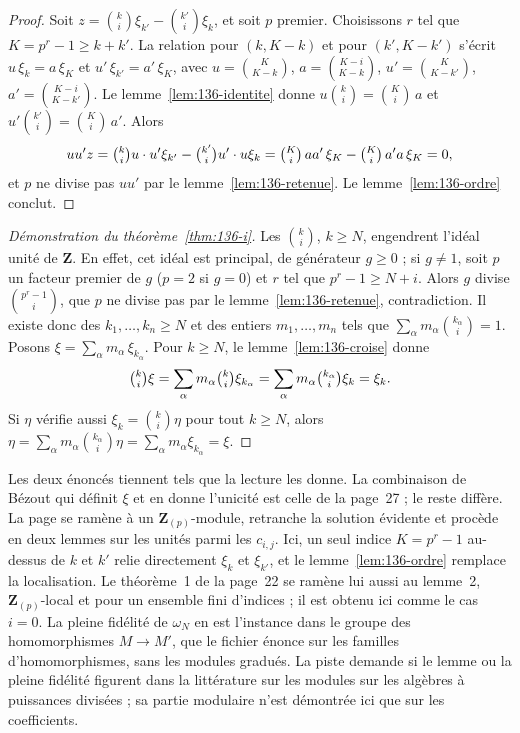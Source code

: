 \begin{proof}
Soit $z = \binom{k}{i} \xi_{k'} - \binom{k'}{i} \xi_k$, et soit $p$ premier. Choisissons $r$ tel que $K = p^r - 1 \geq k + k'$. La relation pour $(k, K - k)$ et pour $(k', K - k')$ s'écrit $u\, \xi_k = a\, \xi_K$ et $u'\, \xi_{k'} = a'\, \xi_K$, avec $u = \binom{K}{K-k}$, $a = \binom{K - i}{K - k}$, $u' = \binom{K}{K-k'}$, $a' = \binom{K-i}{K-k'}$. Le lemme~\ref{lem:136-identite} donne $u \binom{k}{i} = \binom{K}{i}\, a$ et $u' \binom{k'}{i} = \binom{K}{i}\, a'$. Alors
\[ u u' z = \tbinom{k}{i} u \cdot u' \xi_{k'} - \tbinom{k'}{i} u' \cdot u \xi_k = \tbinom{K}{i}\, a a'\, \xi_K - \tbinom{K}{i}\, a' a\, \xi_K = 0, \]
et $p$ ne divise pas $u u'$ par le lemme~\ref{lem:136-retenue}. Le lemme~\ref{lem:136-ordre} conclut.
\end{proof}

\begin{proof}[Démonstration du théorème~\ref{thm:136-i}]
Les $\binom{k}{i}$, $k \geq N$, engendrent l'idéal unité de $\mathbf Z$. En effet, cet idéal est principal, de générateur $g \geq 0$ ; si $g \neq 1$, soit $p$ un facteur premier de $g$ ($p = 2$ si $g = 0$) et $r$ tel que $p^r - 1 \geq N + i$. Alors $g$ divise $\binom{p^r - 1}{i}$, que $p$ ne divise pas par le lemme~\ref{lem:136-retenue}, contradiction. Il existe donc des $k_1, \ldots, k_n \geq N$ et des entiers $m_1, \ldots, m_n$ tels que $\sum_\alpha m_\alpha \binom{k_\alpha}{i} = 1$. Posons $\xi = \sum_\alpha m_\alpha\, \xi_{k_\alpha}$. Pour $k \geq N$, le lemme~\ref{lem:136-croise} donne
\[ \tbinom{k}{i} \xi = \sum_\alpha m_\alpha \tbinom{k}{i} \xi_{k_\alpha} = \sum_\alpha m_\alpha \tbinom{k_\alpha}{i} \xi_k = \xi_k . \]
Si $\eta$ vérifie aussi $\xi_k = \binom{k}{i} \eta$ pour tout $k \geq N$, alors $\eta = \sum_\alpha m_\alpha \binom{k_\alpha}{i} \eta = \sum_\alpha m_\alpha \xi_{k_\alpha} = \xi$.
\end{proof}

\begin{remarque}
Les deux énoncés tiennent tels que la lecture les donne. La combinaison de Bézout qui définit $\xi$ et en donne l'unicité est celle de la page~27 ; le reste diffère. La page se ramène à un $\mathbf Z_{(p)}$-module, retranche la solution évidente et procède en deux lemmes sur les unités parmi les $c_{i,j}$. Ici, un seul indice $K = p^r - 1$ au-dessus de $k$ et $k'$ relie directement $\xi_k$ et $\xi_{k'}$, et le lemme~\ref{lem:136-ordre} remplace la localisation. Le théorème~1 de la page~22 se ramène lui aussi au lemme~2, $\mathbf Z_{(p)}$-local et pour un ensemble fini d'indices ; il est obtenu ici comme le cas $i = 0$. La pleine fidélité de $\omega_N$ en est l'instance dans le groupe des homomorphismes $M \to M'$, que le fichier énonce sur les familles d'homomorphismes, sans les modules gradués. La piste demande si le lemme ou la pleine fidélité figurent dans la littérature sur les modules sur les algèbres à puissances divisées ; sa partie modulaire n'est démontrée ici que sur les coefficients.
\end{remarque}

